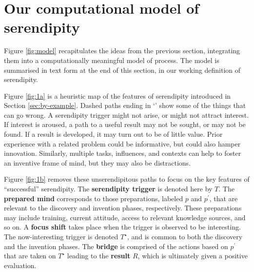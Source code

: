 \section{Our computational model of serendipity} \label{sec:our-model}

Figure \ref{fig:model} recapitulates the ideas from the previous
section, integrating them into a computationally meaningful model of
process.  The model is summarised in text form at the end of this
section, in our working definition of serendipity.

Figure \ref{fig:1a} is a heuristic map of the features of serendipity
introduced in Section \ref{sec:by-example}.
%
Dashed paths ending in `\ymark' show some of the things that can go
wrong.  A serendipity trigger might not arise, or might not attract
interest.  If interest is aroused, a path to a useful result may not
be sought, or may not be found.  If a result is
developed, it may turn out to be of little value.  Prior experience
with a related problem could be informative, but could also hamper
innovation.  Similarly, multiple tasks, influences, and
contexts can help to foster an inventive frame of mind, but they may
also be distractions.

Figure \ref{fig:1b} removes these unserendipitous paths to focus on
the key features of ``successful'' serendipity.
%
The \textbf{serendipity trigger} is denoted here by $T$.  
%
The \textbf{prepared mind} corresponds to those preparations, labeled
$p$ and $p^{\prime}$, that are relevant to the discovery and invention
phases, respectively.  These preparations may include training,
current attitude, access to relevant knowledge sources, and so on.
%
A \textbf{focus shift} takes place when the trigger is observed to be
interesting.  The now-interesting trigger is denoted $T^\star$, and is
common to both the discovery and the invention phases.
%
%
The \textbf{bridge} is comprised of the actions based on $p^{\prime}$
that are taken on $T^\star$ leading to the \textbf{result} $R$, which is ultimately given a positive evaluation.


